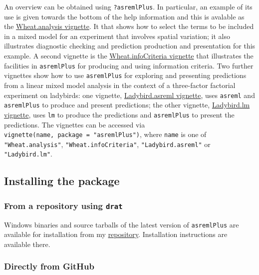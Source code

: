 \documentclass[
]{article}
\begin{document}
An overview can be obtained using \texttt{?asremlPlus}. In particular,
an example of its use is given towards the bottom of the help
information and this is avalable as the
\href{./vignettes/Wheat.analysis.pdf}{Wheat.analysis vignette}. It that
shows how to select the terms to be included in a mixed model for an
experiment that involves spatial variation; it also illustrates
diagnostic checking and prediction production and presentation for this
example. A second vignette is the
\href{./vignettes/Wheat.infoCriteria.pdf}{Wheat.infoCriteria vignette}
that illustrates the facilities in \texttt{asremlPlus} for producing and
using information criteria. Two further vignettes show how to use
\texttt{asremlPlus} for exploring and presenting predictions from a
linear mixed model analysis in the context of a three-factor factorial
experiment on ladybirds: one vignette,
\href{./vignettes/Ladybird.asreml.pdf}{Ladybird.asreml vignette}, uses
\texttt{asreml} and \texttt{asremlPlus} to produce and present
predictions; the other vignette,
\href{./vignettes/Ladybird.asreml.pdf}{Ladybird.lm vignette}, uses
\texttt{lm} to produce the predictions and \texttt{asremlPlus} to
present the predictions. The vignettes can be accessed via
\texttt{vignette(name,\ package\ =\ "asremlPlus")}, where \texttt{name}
is one of \texttt{"Wheat.analysis"}, \texttt{"Wheat.infoCriteria"},
\texttt{"Ladybird.asreml"} or \texttt{"Ladybird.lm"}.

\subsection{Installing the package}\label{installing-the-package}

\subsubsection{\texorpdfstring{From a repository using
\texttt{drat}}{From a repository using drat}}\label{from-a-repository-using-drat}

Windows binaries and source tarballs of the latest version of
\texttt{asremlPlus} are available for installation from my
\href{http://chris.brien.name/rpackages}{repository}. Installation
instructions are available there.

\subsubsection{Directly from GitHub}\label{directly-from-github}
\end{document}
